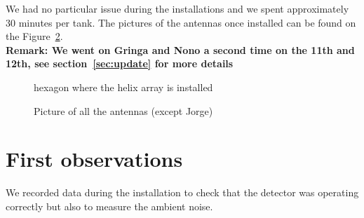 We  had no  particular issue  during  the installations  and we  spent
approximately 30 minutes  per tank. The pictures of  the antennas once
installed can be found on the Figure~\ref{fig:pics}.\\ \textbf{Remark:
  We went on Gringa  and Nono a second time on the  11th and 12th, see
  section~\ref{sec:update} for more details}
\begin{figure}[ht!]
  \centering
  \hspace*{-3ex}
  \caption{hexagon where the helix array is installed}
  \label{fig:hexagon}
\end{figure}
\begin{figure}[ht!]
  \centering
  \hspace*{-3ex}
  \caption{Picture of all the antennas (except Jorge)}
  \label{fig:pics}
\end{figure}
\clearpage
\section{First observations}
We recorded  data during the  installation to check that  the detector
was operating correctly but also to measure the ambient noise. 
